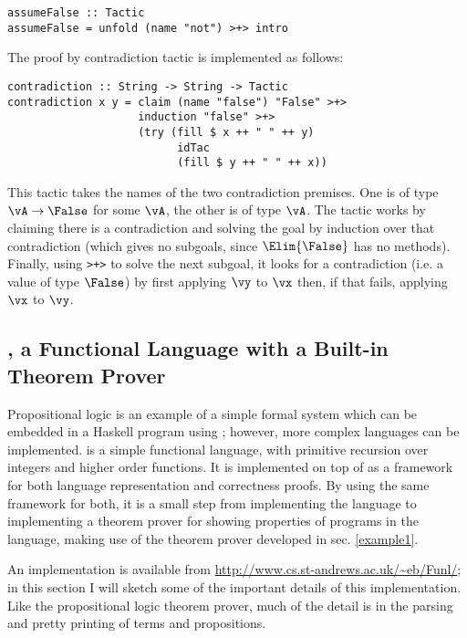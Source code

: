 \begin{verbatim}
assumeFalse :: Tactic
assumeFalse = unfold (name "not") >+> intro 
\end{verbatim}

The proof by contradiction tactic
is implemented as follows:
\\

\begin{verbatim}
contradiction :: String -> String -> Tactic
contradiction x y = claim (name "false") "False" >+>
                    induction "false" >+>
                    (try (fill $ x ++ " " ++ y)
                          idTac
                          (fill $ y ++ " " ++ x))
\end{verbatim}

This tactic takes the names of the two contradiction premises. One is
of type $\vA\to\False$ for some $\vA$, the other is of type
$\vA$. The tactic works by claiming there is a contradiction and
solving the goal by induction over that contradiction (which gives no
subgoals, since $\Elim{\False}$ has no methods). Finally, using
\texttt{>+>} to solve the next subgoal, it looks for a contradiction
(i.e. a value of type $\False$)
by first applying $\vy$ to $\vx$ then, if that fails, applying $\vx$
to $\vy$.

\subsection{\Funl{}, a Functional Language with a Built-in Theorem Prover}

\label{example2}

Propositional logic is an example of a simple formal system which can
be embedded in a Haskell program using \Ivor{}; however, more
complex languages can be implemented. \Funl{} is a simple functional
language, with primitive recursion over integers and higher order
functions. It is implemented on top of \Ivor{} as a framework for both
language representation and correctness proofs. By using the same
framework for both, it
is a small step from implementing the language to implementing a
theorem prover for showing properties of programs in the language,
making use of the theorem prover developed in sec. \ref{example1}.

An implementation is available from
\url{http://www.cs.st-andrews.ac.uk/~eb/Funl/}; in this section I will
sketch some of the important details of this implementation. Like the
propositional logic theorem prover, much of the detail is in the
parsing and pretty printing of terms and propositions.

